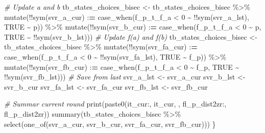 \documentclass[
]{book}
\newenvironment{Shaded}{\begin{snugshade}}{\end{snugshade}}
\newcommand{\CommentTok}[1]{\textcolor[rgb]{0.56,0.35,0.01}{\textit{#1}}}
\newcommand{\ConstantTok}[1]{\textcolor[rgb]{0.00,0.00,0.00}{#1}}
\newcommand{\DecValTok}[1]{\textcolor[rgb]{0.00,0.00,0.81}{#1}}
\newcommand{\ErrorTok}[1]{\textcolor[rgb]{0.64,0.00,0.00}{\textbf{#1}}}
\newcommand{\FunctionTok}[1]{\textcolor[rgb]{0.00,0.00,0.00}{#1}}
\newcommand{\NormalTok}[1]{#1}
\newcommand{\OtherTok}[1]{\textcolor[rgb]{0.56,0.35,0.01}{#1}}
\newcommand{\SpecialCharTok}[1]{\textcolor[rgb]{0.00,0.00,0.00}{#1}}
\newcommand{\StringTok}[1]{\textcolor[rgb]{0.31,0.60,0.02}{#1}}
\begin{document}
\begin{Shaded}
\begin{Highlighting}[]
  \CommentTok{\# Update a and b}
\NormalTok{  tb\_states\_choices\_bisec }\OtherTok{\textless{}{-}}\NormalTok{ tb\_states\_choices\_bisec }\SpecialCharTok{\%\textgreater{}\%}
    \FunctionTok{mutate}\NormalTok{(}\SpecialCharTok{!!}\FunctionTok{sym}\NormalTok{(svr\_a\_cur) }\SpecialCharTok{:}\ErrorTok{=}
             \FunctionTok{case\_when}\NormalTok{(f\_p\_t\_f\_a }\SpecialCharTok{\textless{}} \DecValTok{0} \SpecialCharTok{\textasciitilde{}} \SpecialCharTok{!!}\FunctionTok{sym}\NormalTok{(svr\_a\_lst),}
                       \ConstantTok{TRUE} \SpecialCharTok{\textasciitilde{}}\NormalTok{ p)) }\SpecialCharTok{\%\textgreater{}\%}
    \FunctionTok{mutate}\NormalTok{(}\SpecialCharTok{!!}\FunctionTok{sym}\NormalTok{(svr\_b\_cur) }\SpecialCharTok{:}\ErrorTok{=}
             \FunctionTok{case\_when}\NormalTok{(f\_p\_t\_f\_a }\SpecialCharTok{\textless{}} \DecValTok{0} \SpecialCharTok{\textasciitilde{}}\NormalTok{ p,}
                       \ConstantTok{TRUE} \SpecialCharTok{\textasciitilde{}} \SpecialCharTok{!!}\FunctionTok{sym}\NormalTok{(svr\_b\_lst)))}
  \CommentTok{\# Update f(a) and f(b)}
\NormalTok{  tb\_states\_choices\_bisec }\OtherTok{\textless{}{-}}\NormalTok{ tb\_states\_choices\_bisec }\SpecialCharTok{\%\textgreater{}\%}
    \FunctionTok{mutate}\NormalTok{(}\SpecialCharTok{!!}\FunctionTok{sym}\NormalTok{(svr\_fa\_cur) }\SpecialCharTok{:}\ErrorTok{=}
             \FunctionTok{case\_when}\NormalTok{(f\_p\_t\_f\_a }\SpecialCharTok{\textless{}} \DecValTok{0} \SpecialCharTok{\textasciitilde{}} \SpecialCharTok{!!}\FunctionTok{sym}\NormalTok{(svr\_fa\_lst),}
                       \ConstantTok{TRUE} \SpecialCharTok{\textasciitilde{}}\NormalTok{ f\_p)) }\SpecialCharTok{\%\textgreater{}\%}
    \FunctionTok{mutate}\NormalTok{(}\SpecialCharTok{!!}\FunctionTok{sym}\NormalTok{(svr\_fb\_cur) }\SpecialCharTok{:}\ErrorTok{=}
             \FunctionTok{case\_when}\NormalTok{(f\_p\_t\_f\_a }\SpecialCharTok{\textless{}} \DecValTok{0} \SpecialCharTok{\textasciitilde{}}\NormalTok{ f\_p,}
                       \ConstantTok{TRUE} \SpecialCharTok{\textasciitilde{}} \SpecialCharTok{!!}\FunctionTok{sym}\NormalTok{(svr\_fb\_lst)))}
  \CommentTok{\# Save from last}
\NormalTok{  svr\_a\_lst }\OtherTok{\textless{}{-}}\NormalTok{ svr\_a\_cur}
\NormalTok{  svr\_b\_lst }\OtherTok{\textless{}{-}}\NormalTok{ svr\_b\_cur}
\NormalTok{  svr\_fa\_lst }\OtherTok{\textless{}{-}}\NormalTok{ svr\_fa\_cur}
\NormalTok{  svr\_fb\_lst }\OtherTok{\textless{}{-}}\NormalTok{ svr\_fb\_cur}

  \CommentTok{\# Summar current round}
  \FunctionTok{print}\NormalTok{(}\FunctionTok{paste0}\NormalTok{(}\StringTok{\textquotesingle{}it\_cur:\textquotesingle{}}\NormalTok{, it\_cur, }\StringTok{\textquotesingle{}, fl\_p\_dist2zr:\textquotesingle{}}\NormalTok{, fl\_p\_dist2zr))}
  \FunctionTok{summary}\NormalTok{(tb\_states\_choices\_bisec }\SpecialCharTok{\%\textgreater{}\%}
            \FunctionTok{select}\NormalTok{(}\FunctionTok{one\_of}\NormalTok{(svr\_a\_cur, svr\_b\_cur, svr\_fa\_cur, svr\_fb\_cur)))}
\NormalTok{\}}
\end{Highlighting}
\end{Shaded}
\end{document}
